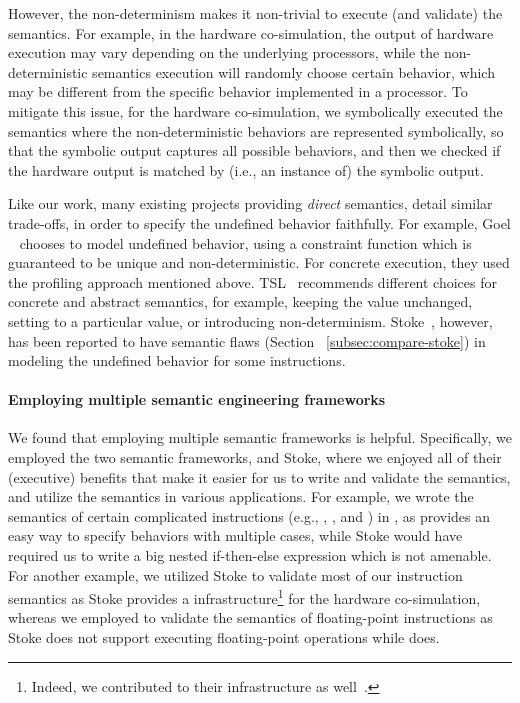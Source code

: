 {However, the non-determinism makes it non-trivial to execute (and validate) the semantics.
For example, in the hardware co-simulation, the output of hardware execution may vary depending on the underlying processors, while the non-deterministic semantics execution will randomly choose certain behavior, which may be different from the specific behavior implemented in a processor.
To mitigate this issue, for the hardware co-simulation, we symbolically executed the semantics where the non-deterministic behaviors are represented symbolically, so that the symbolic output captures all possible behaviors, and then we checked if the hardware output is matched by (i.e., an instance of) the symbolic output. 

Like our work, many existing projects providing \emph{direct} \ISA semantics, detail similar trade-offs, in order to specify the undefined behavior faithfully. For example, Goel \etal~\cite{Goel:ProCoS17} chooses to model undefined behavior, using a constraint function which is guaranteed to be unique and non-deterministic. For concrete execution, they used the profiling approach mentioned above. TSL~\cite{TSL:TOPLAS13} recommends different choices for concrete and abstract semantics, for example, keeping the value unchanged, setting to a particular value, or introducing non-determinism. Stoke~\cite{Stoke2013}, however, has been reported to have semantic flaws (Section ~\ref{subsec:compare-stoke}) in modeling the undefined behavior for some instructions.    

\paragraph{Employing multiple semantic engineering frameworks}

We found that employing multiple semantic frameworks is helpful. Specifically, we employed the two semantic frameworks, \K and Stoke, where we enjoyed all of their (executive) benefits that make it easier for us to write and validate the semantics, and utilize the semantics in various applications. For example, we wrote the semantics of certain complicated instructions (e.g., , , and ) in \K, as \K provides an easy way to specify behaviors with multiple cases, while Stoke would have required us to write a big nested if-then-else expression which is not amenable. For another example, we utilized Stoke to validate most of our instruction semantics as Stoke provides a infrastructure\footnote{Indeed, we contributed to their infrastructure as well~\cite{completing-stock,improving-stoke}.} for the hardware co-simulation, whereas we employed \K to validate the semantics of floating-point instructions as Stoke does not support executing floating-point operations while \K does.

}
